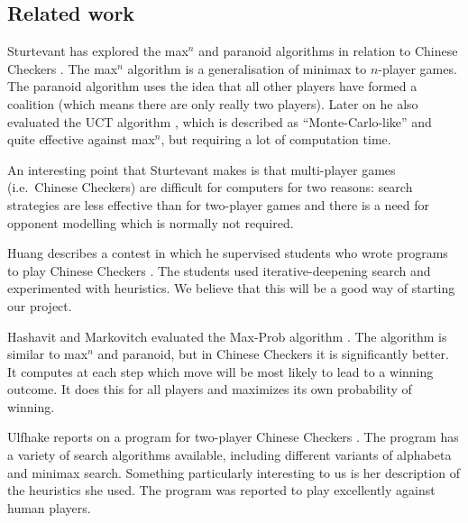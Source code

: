 \documentclass[a4paper,11pt]{article}
\begin{document}
\subsection{Related work}
Sturtevant has explored the max$^n$ and paranoid algorithms in
relation to Chinese Checkers
\cite{springerlink:10.1007/978-3-540-40031-8_8}. The max$^n$ algorithm
is a generalisation of minimax to $n$-player games. The paranoid
algorithm uses the idea that all other players have formed a coalition
(which means there are only really two players). Later on he also
evaluated the UCT algorithm
\cite{springerlink:10.1007/978-3-540-87608-3_4}, which is described as
``Monte-Carlo-like'' and quite effective against max$^n$, but
requiring a lot of computation time.

An interesting point that Sturtevant makes is that multi-player games
(i.e.~Chinese Checkers) are difficult for computers for two reasons:
search strategies are less effective than for two-player games and
there is a need for opponent modelling which is normally not required.

Huang describes a contest in which he supervised students who wrote
programs to play Chinese Checkers \cite{Huang:2001:SGP:378593.378708}.
The students used iter\-ative-deep\-ening search and experimented with
heuristics. We believe that this will be a good way of starting our
project.

Hashavit and Markovitch evaluated the Max-Prob algorithm
\cite{Hashavit}. The algorithm is similar to max$^n$ and paranoid, but
in Chinese Checkers it is significantly better. It computes at each
step which move will be most likely to lead to a winning outcome. It
does this for all players and maximizes its own probability of
winning.

Ulfhake reports on a program for two-player Chinese Checkers
\cite{ulfhake}. The program has a variety of search algorithms
available, including different variants of alphabeta and minimax
search. Something particularly interesting to us is her description of
the heuristics she used. The program was reported to play excellently
against human players.

\end{document}

